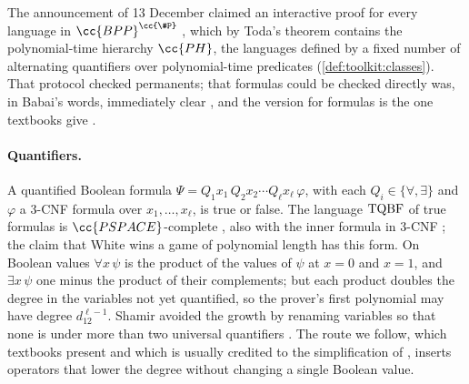 \begin{refsection}
The announcement of 13 December claimed an interactive proof for every language in $\cc{BPP}^{\cc{\#P}}$ \parencite{Babai1990}, which by Toda's theorem \parencite{Toda1991} contains the polynomial-time hierarchy $\cc{PH}$, the languages defined by a fixed number of alternating quantifiers over polynomial-time predicates (\cref{def:toolkit:classes}). That protocol checked permanents; that formulas could be checked directly was, in Babai's words, immediately clear \parencite[\S8]{Babai1990}, and the version for formulas is the one textbooks give \parencite{AroraBarak2009,Thaler2022}.

\paragraph{Quantifiers.} A quantified Boolean formula $\Psi=Q_1x_1\,Q_2x_2\cdots Q_\ell x_\ell\,\varphi$, with each $Q_i\in\{\forall,\exists\}$ and $\varphi$ a 3-CNF formula over $x_1,\dots,x_\ell$, is true or false. The language $\mathrm{TQBF}$ of true formulas is $\cc{PSPACE}$-complete \parencite{StockmeyerMeyer1973}, also with the inner formula in 3-CNF \parencite[Chapter~4]{AroraBarak2009}; the claim that White wins a game of polynomial length has this form. On Boolean values $\forall x\,\psi$ is the product of the values of $\psi$ at $x=0$ and $x=1$, and $\exists x\,\psi$ one minus the product of their complements; but each product doubles the degree in the variables not yet quantified, so the prover's first polynomial may have degree $d_12^{\ell-1}$. Shamir avoided the growth by renaming variables so that none is under more than two universal quantifiers \parencite[\S9]{Babai1990}. The route we follow, which textbooks present \parencite{AroraBarak2009} and which is usually credited to the simplification of \textcite{Shen1992}, inserts operators that lower the degree without changing a single Boolean value.


\end{refsection}

